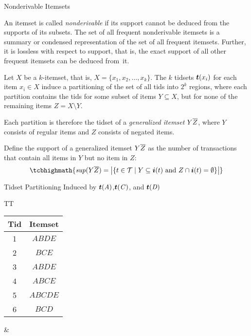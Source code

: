 \begin{frame}{Nonderivable Itemsets}
\small

An itemset is called {\em nonderivable} if its support cannot be deduced
from the supports of its subsets.  The set of all frequent nonderivable
itemsets is a summary or condensed representation of the set of all
frequent itemsets.  Further, it is lossless with respect to support,
that is, the exact support of all other frequent itemsets can be deduced
from~it.

 Let $X$ be a $k$-itemset, that is,
$X=\{x_1,x_2,\ldots,x_k\}$.  The $k$ tidsets  ${{\boldsymbol t}}(x_i)$ for each item
$x_i\in X$ induce a partitioning of the set of all tids into $2^k$
regions, where each partition contains the tids for some subset of items
$Y\subseteq X$, but for none of the remaining items $Z=X\setminus Y$. 

\medskip Each partition is therefore the tidset of a {\em generalized
itemset} $Y\overline{Z}$, where $Y$ consists of regular items and $Z$ consists
of negated items. 

\medskip
Def\/{i}ne the support of a generalized itemset $Y\overline{Z}$ as the number
of transactions that contain all items in $Y$ but no item in $Z$:
\begin{align*}
\tcbhighmath{
  \supp(Y\ol{Z}) = \bigl| \{ t \in \cT \mid Y \subseteq \vI(t)
  \text{ and } Z \cap \vI(t) = \emptyset\} \bigr|
}
\end{align*}
\end{frame}


\begin{frame}{Tidset Partitioning Induced by ${{\boldsymbol t}}({\it A})$,${{\boldsymbol t}}({\it C})$, and ${{\boldsymbol t}}({\it D})$} 

\begin{tabular}{TT}
{
\begin{tabular}{|c|c|}
  \hline
  Tid & Itemset\\
\hline
1 & $\mathit{ABDE}$\\
2 & $\mathit{BCE}$\\
3 & $\mathit{ABDE}$\\
4 & $\mathit{ABCE}$\\
5 & $\mathit{ABCDE}$\\
6 & $\mathit{BCD}$\\
\hline
\end{tabular} 
} & { 
\small
{}
} \\
\end{tabular}
\end{frame}


